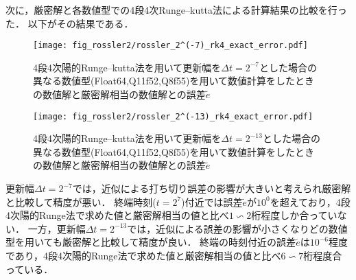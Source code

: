 次に，厳密解と各数値型での4段4次Runge--kutta法による計算結果の比較を行った．
以下がその結果である．\\
\begin{figure}[H]
    \centering
    \begin{minipage}[b]{0.48\columnwidth}
        \centering
        \texttt{[image: fig\_rossler2/rossler\_2^(-7)\_rk4\_exact\_error.pdf]}
        \caption{4段4次陽的Runge--kutta法を用いて更新幅を$\Delta t = 2^{-7}$とした場合の異なる数値型(Float64,Q11f52,Q8f55)を用いて数値計算をしたときの数値解と厳密解相当の数値解との誤差$\tilde{e}$}   
        \label{fig:rossler_2^(-7)_rk4_exact_error}
    \end{minipage}
    \hspace{0.01\columnwidth}
    \begin{minipage}[b]{0.48\columnwidth}
        \centering
        \texttt{[image: fig\_rossler2/rossler\_2^(-13)\_rk4\_exact\_error.pdf]}
        \caption{4段4次陽的Runge--kutta法を用いて更新幅を$\Delta t =  2^{-13}$とした場合の異なる数値型(Float64,Q11f52,Q8f55)を用いて数値計算をしたときの数値解と厳密解相当の数値解との誤差$\tilde{e}$}
        \label{fig:rossler_2^(-13)_rk4_exact_error}
    \end{minipage}
\end{figure}
更新幅$\Delta t = 2^{-7}$では，近似による打ち切り誤差の影響が大きいと考えられ厳密解と比較して精度が悪い．
終端時刻($t=2^7$)付近では誤差$\tilde{e}$が$10^0$を超えており，4段4次陽的Runge法で求めた値と厳密解相当の値と比べ$1\backsim2$桁程度しか合っていない．
一方，更新幅$\Delta t =  2^{-13}$では，近似による誤差の影響が小さくなりどの数値型を用いても厳密解と比較して精度が良い．
終端の時刻付近の誤差$\tilde{e}$は$10^{-6}$程度であり，4段4次陽的Runge法で求めた値と厳密解相当の値と比べ$6\backsim7$桁程度合っている．

